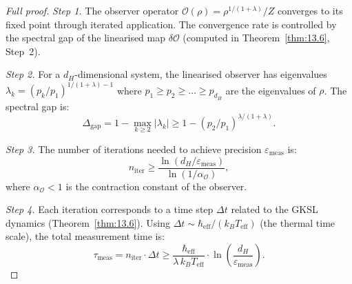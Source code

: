 \begin{proof}[Full proof]
\emph{Step 1.} The observer operator
$\mathcal{O}(\rho) = \rho^{1/(1+\lambda)} / Z$ converges to its
fixed point through iterated application.  The convergence rate
is controlled by the spectral gap of the linearised map
$\delta\mathcal{O}$ (computed in Theorem~\ref{thm:13.6}, Step~2).

\emph{Step 2.} For a $d_H$-dimensional system, the linearised
observer has eigenvalues $\lambda_k = (p_k / p_1)^{1/(1+\lambda) - 1}$
where $p_1 \geq p_2 \geq \ldots \geq p_{d_H}$ are the eigenvalues
of $\rho$.  The spectral gap is:
\[
  \Delta_{\mathrm{gap}} = 1 - \max_{k \geq 2} |\lambda_k|
  \geq 1 - (p_2 / p_1)^{\lambda/(1+\lambda)}.
\]

\emph{Step 3.} The number of iterations needed to achieve precision
$\varepsilon_{\mathrm{meas}}$ is:
\[
  n_{\mathrm{iter}} \geq
  \frac{\ln(d_H / \varepsilon_{\mathrm{meas}})}
  {\ln(1/\alpha_{\mathcal{O}})},
\]
where $\alpha_{\mathcal{O}} < 1$ is the contraction constant
of the observer.

\emph{Step 4.} Each iteration corresponds to a time step $\Delta t$
related to the GKSL dynamics (Theorem~\ref{thm:13.6}).
Using $\Delta t \sim \hbar_{\mathrm{eff}} / (k_B T_{\mathrm{eff}})$
(the thermal time scale), the total measurement time is:
\[
  \tau_{\mathrm{meas}} = n_{\mathrm{iter}} \cdot \Delta t
  \geq \frac{\hbar_{\mathrm{eff}}}{\lambda\,k_B T_{\mathrm{eff}}}
  \cdot \ln\!\left(\frac{d_H}{\varepsilon_{\mathrm{meas}}}\right).
\]
\end{proof}
